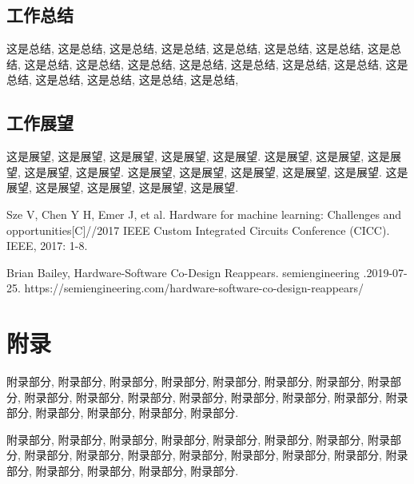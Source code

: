 \documentclass[UTF8,openright]{ctexbook}
\begin{document}
\section {工作总结}

这是总结, 这是总结, 这是总结, 这是总结, 这是总结, 
这是总结, 这是总结, 这是总结, 这是总结, 这是总结, 
这是总结, 这是总结, 这是总结, 这是总结, 这是总结, 
这是总结, 这是总结, 这是总结, 这是总结, 这是总结, 

\newpage
\section {工作展望}

这是展望, 这是展望, 这是展望, 这是展望, 这是展望.
这是展望, 这是展望, 这是展望, 这是展望, 这是展望.
这是展望, 这是展望, 这是展望, 这是展望, 这是展望.
这是展望, 这是展望, 这是展望, 这是展望, 这是展望.

\clearpage%
\backmatter
\linespread{1.6}\selectfont
\setlength{\bibsep}{1ex}  %
\begin{thebibliography}{99}
\thispagestyle{fancy}



Sze V, Chen Y H, Emer J, et al. Hardware for machine learning: Challenges and opportunities[C]//2017 IEEE Custom Integrated Circuits Conference (CICC). IEEE, 2017: 1-8.

Brian Bailey, Hardware-Software Co-Design Reappears. semiengineering .2019-07-25. https://semiengineering.com/hardware-software-co-design-reappears/
 



\end{thebibliography}


\clearpage{\pagestyle{fancy}\cleardoublepage}
\chapter*{附录}
附录部分, 附录部分, 附录部分, 附录部分, 附录部分,
附录部分, 附录部分, 附录部分, 附录部分, 附录部分,
附录部分, 附录部分, 附录部分, 附录部分, 附录部分,
附录部分, 附录部分, 附录部分, 附录部分, 附录部分.

附录部分, 附录部分, 附录部分, 附录部分, 附录部分,
附录部分, 附录部分, 附录部分, 附录部分, 附录部分,
附录部分, 附录部分, 附录部分, 附录部分, 附录部分,
附录部分, 附录部分, 附录部分, 附录部分, 附录部分.
\end{document}
